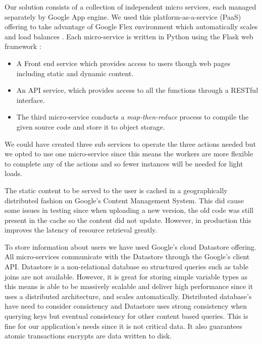 \documentclass[conference]{IEEEtran}
\begin{document}
Our solution consists of a collection of independent micro services, each
managed separately by Google App engine. We used this platform-as-a-service (PaaS) offering to take advantage of Google Flex environment which automatically scales and load balances \cite{GAE}. Each micro-service is written in Python using the Flask web framework \cite{Flask}:

\begin{itemize}
\item A Front end service which provides access to users though web
pages including static and dynamic content.

\item An API service, which provides
access to all the functions through a RESTful interface.

\item The third micro-service conducts a \emph{map-then-reduce} process to
compile the given source code and store it to object storage. 
\end{itemize}

We could have created three
sub services to operate the three actions needed but we opted to use one micro-service since this means the workers are more flexible to complete any of the actions and so fewer instances will be needed for light loads.

The static content to be served to the user is cached in a geographically distributed fashion on Google's Content Management System. This did cause some issues in testing since when uploading a new version, the old code was still present in the cache so the content did not update. However, in production this improves the latency of resource retrieval greatly.

To store information about users we have used Google's cloud Datastore offering. All micro-services communicate with the Datastore through the Google's client API. Datastore is a non-relational database so structured queries such as table joins are not available. However, it is great for storing simple variable types as this means is able to be massively scalable and deliver high performance since it uses a distributed architecture, and scales automatically. Distributed database's have need to consider consistency and Datastore uses strong consistency when querying keys but eventual consistency for other content based queries. This is fine for our application's needs since it is not critical data. It also guarantees atomic transactions encrypts are data written to disk.
\end{document}
